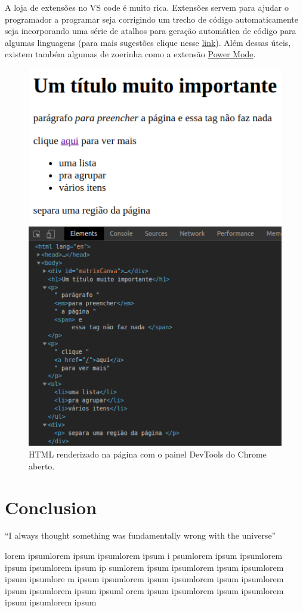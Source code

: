 \documentclass{article}
\begin{document}
A loja de extensões no VS code é muito rica. Extensões servem para
ajudar o programador a programar seja corrigindo um trecho de código
automaticamente seja incorporando uma série de atalhos para geração
automática de código para algumas linguagens (para mais sugestões clique
nesse
\href{https://www.ubuntupit.com/best-visual-studio-code-extensions-for-programmers/}{link}).
Além dessas úteis, existem também algumas de zoerinha como a extensão
\href{https://marketplace.visualstudio.com/items?itemName=hoovercj.vscode-power-mode}{Power
Mode}.

\begin{figure}[h!]
    \centering
    \includegraphics[scale=.5]{imgs/page-chr-dev-tools.png}
    \caption{HTML renderizado na página com o painel DevTools do Chrome aberto.}
    \label{fig:page-chr-dev-tools}
\end{figure}

\newpage
\section{Conclusion}
``I always thought something was fundamentally wrong with the universe'' \citep{adams1995hitchhiker}

lorem ipsumlorem ipsum ipsumlorem ipsum i
psumlorem ipsum ipsumlorem ipsum ipsumlorem ipsum ip
sumlorem ipsum ipsumlorem ipsum ipsumlorem ipsum ipsumlore
m ipsum ipsumlorem ipsum ipsumlorem ipsum ipsumlorem ipsum ipsumlorem ipsum ipsuml
orem ipsum ipsumlorem ipsum 
ipsumlorem ipsum ipsumlorem ipsum 




\end{document}
